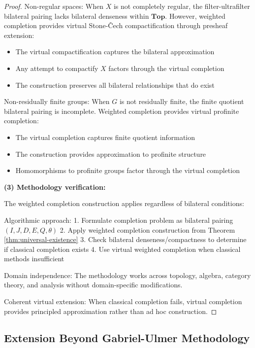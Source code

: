 \documentclass[11pt]{article}
\theoremstyle{plain}
\theoremstyle{definition}
\theoremstyle{remark}
\begin{document}
\begin{proof}
Non-regular spaces: When $X$ is not completely regular, the filter-ultrafilter bilateral pairing lacks bilateral denseness within $\mathbf{Top}$. However, weighted completion provides virtual Stone-\v{C}ech compactification through presheaf extension:
\begin{itemize}
\item The virtual compactification captures the bilateral approximation
\item Any attempt to compactify $X$ factors through the virtual completion
\item The construction preserves all bilateral relationships that do exist
\end{itemize}

Non-residually finite groups: When $G$ is not residually finite, the finite quotient bilateral pairing is incomplete. Weighted completion provides virtual profinite completion:
\begin{itemize}
\item The virtual completion captures finite quotient information  
\item The construction provides approximation to profinite structure
\item Homomorphisms to profinite groups factor through the virtual completion
\end{itemize}

\textbf{(3) Methodology verification:}

The weighted completion construction applies regardless of bilateral conditions:

Algorithmic approach:
1. Formulate completion problem as bilateral pairing $(I, J, D, E, Q, \theta)$
2. Apply weighted completion construction from Theorem \ref{thm:universal-existence}
3. Check bilateral denseness/compactness to determine if classical completion exists
4. Use virtual weighted completion when classical methods insufficient

Domain independence: The methodology works across topology, algebra, category theory, and analysis without domain-specific modifications.

Coherent virtual extension: When classical completion fails, virtual completion provides principled approximation rather than ad hoc construction.
\end{proof}

\subsection{Extension Beyond Gabriel-Ulmer Methodology}
\end{document}
